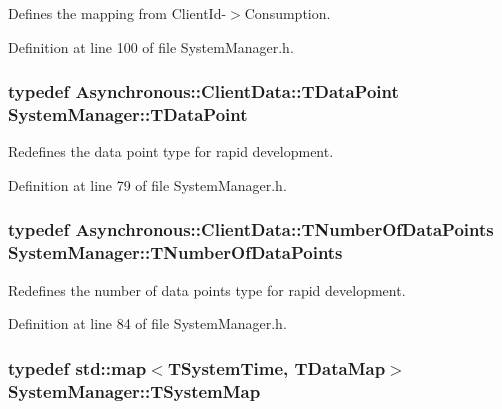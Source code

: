 Defines the mapping from Client\-Id-\/$>$Consumption. 



Definition at line 100 of file System\-Manager.\-h.

\hypertarget{class_system_manager_a177b09f79bd2cef44160fb4d8ea77996}{
\subsubsection[{T\-Data\-Point}]{\setlength{\rightskip}{0pt plus 5cm}typedef {\bf Asynchronous\-::\-Client\-Data\-::\-T\-Data\-Point} {\bf System\-Manager\-::\-T\-Data\-Point}}}\label{class_system_manager_a177b09f79bd2cef44160fb4d8ea77996}


Redefines the data point type for rapid development. 



Definition at line 79 of file System\-Manager.\-h.

\hypertarget{class_system_manager_a9cb6753ad6cd26b6ad46c194f38bee77}{
\subsubsection[{T\-Number\-Of\-Data\-Points}]{\setlength{\rightskip}{0pt plus 5cm}typedef {\bf Asynchronous\-::\-Client\-Data\-::\-T\-Number\-Of\-Data\-Points} {\bf System\-Manager\-::\-T\-Number\-Of\-Data\-Points}}}\label{class_system_manager_a9cb6753ad6cd26b6ad46c194f38bee77}


Redefines the number of data points type for rapid development. 



Definition at line 84 of file System\-Manager.\-h.

\hypertarget{class_system_manager_aae66953e62823ae14519c7e9b3925864}{
\subsubsection[{T\-System\-Map}]{\setlength{\rightskip}{0pt plus 5cm}typedef std\-::map$<${\bf T\-System\-Time}, {\bf T\-Data\-Map}$>$ {\bf System\-Manager\-::\-T\-System\-Map}\hspace{0.3cm}{\ttfamily [private]}}}\label{class_system_manager_aae66953e62823ae14519c7e9b3925864}


